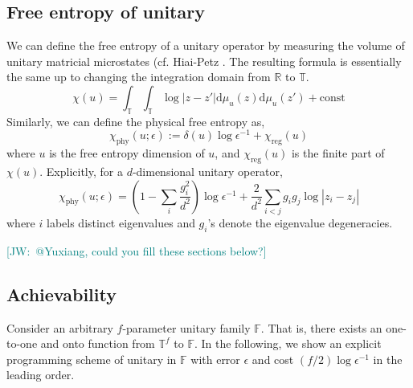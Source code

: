 \documentclass[11pt,letterpaper]{article}
\newcommand{\dd}{\mathrm{d}}
\newcommand{\JW}[1]{\textcolor{teal}{[JW:\ #1]}}
\begin{document}
\subsection{Free entropy of unitary}
We can define the free entropy of a unitary operator by measuring the volume of unitary matricial microstates (cf. Hiai-Petz \cite{hiai2000semicircle}. The resulting formula is essentially the same up to changing the integration domain from $\mathbb{R}$ to $\mathbb{T}$. 
\begin{equation}
    \chi(u)=\int_\mathbb{T}\int_\mathbb{T}\log|z-z'|\dd\mu_u(z)\dd\mu_u(z')+ \mathrm{const}
\end{equation}
Similarly, we can define the physical free entropy as,
\begin{equation}
    \chi_\mathrm{phy}(u;\epsilon):=\delta(u)\log\epsilon^{-1} + \chi_\mathrm{reg}(u)
\end{equation}
where $u$ is the free entropy dimension of $u$, and $\chi_\mathrm{reg}(u)$ is the finite part of $\chi(u)$. Explicitly, for a $d$-dimensional unitary operator,
\begin{equation}
    \chi_\mathrm{phy}(u;\epsilon) = \left(1-\sum_i \frac{g_i^2}{d^2}\right)\log\epsilon^{-1} + \frac{2}{d^2}\sum_{i < j}g_ig_j\log|z_i-z_j|
\end{equation}
where $i$ labels distinct eigenvalues and $g_i$'s denote the eigenvalue degeneracies.




\JW{@Yuxiang, could you fill these sections below?}
\subsection{Achievability}\label{subsec:programmingunitary}
Consider an arbitrary $f$-parameter unitary family $\mathbb{F}$. That is, there exists an one-to-one and onto function from $\mathbb{T}^f$ to $\mathbb{F}$.  In the following, we show an explicit programming scheme of unitary in $\mathbb{F}$ with error $\epsilon$ and cost $(f/2)\log\epsilon^{-1}$ in the leading order.
 
\end{document}
